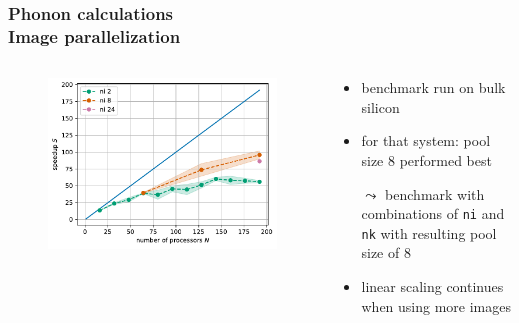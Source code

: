 \documentclass[aspectratio=169]{beamer}
\begin{document}
\begin{frame}
	\frametitle{Phonon calculations\\ Image parallelization}

	\begin{columns}
		\begin{column}{0.5\textwidth}
			\begin{figure}
				\includegraphics[width=\textwidth]{figs/si_ph_poolsize_8_bench_ni_speedup.pdf}
			\end{figure}
		\end{column}

		\begin{column}{0.5\textwidth}
			\begin{itemize}
				\item benchmark run on bulk silicon
				\item for that system: pool size 8 performed best
				\item[\(\leadsto\)] benchmark with combinations of \texttt{ni} and \texttt{nk} with resulting pool size of 8
				\item linear scaling continues when using more images
			\end{itemize}
		\end{column}
	\end{columns}

\end{frame}


\end{document}
